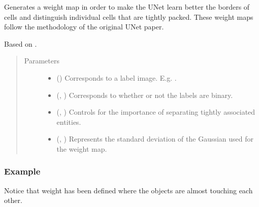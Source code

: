 \documentclass[letterpaper,10pt,english]{sphinxmanual}
\let\sphinxpxdimen\pdfpxdimen\else\newdimen\sphinxpxdimen
\begin{document}
\begin{fulllineitems}
\label{\detokenize{utils/util:utils.util.make_weight_map}}
Generates a weight map in order to make the U\sphinxhyphen{}Net learn better the borders of cells and distinguish individual
cells that are tightly packed. These weight maps follow the methodology of the original U\sphinxhyphen{}Net paper.

Based on .
\begin{quote}\begin{description}
\item[{Parameters}] \leavevmode\begin{itemize}
\item {} 
 () \textendash{} Corresponds to a label image. E.g. .

\item {} 
 (, ) \textendash{} Corresponds to whether or not the labels are binary.

\item {} 
 (, ) \textendash{} Controls for the importance of separating tightly associated entities.

\item {} 
 (, ) \textendash{} Represents the standard deviation of the Gaussian used for the weight map.

\end{itemize}

\end{description}\end{quote}
\subsubsection*{Example}

Notice that weight has been defined where the objects are almost touching
each other.

\noindent{\hspace*{\fill}\sphinxincludegraphics[width=650\sphinxpxdimen]{{weight_map}.png}\hspace*{\fill}}

\end{fulllineitems}
\end{document}
